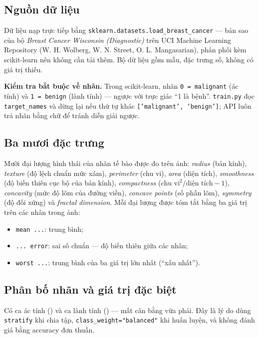 \documentclass[12pt]{article}
\newcommand{\canhbao}[1]{\par\noindent\colorbox{warnbg}{\parbox{\dimexpr\linewidth-2\fboxsep}{#1}}\par}
\begin{document}
\subsection{Nguồn dữ liệu}
Dữ liệu nạp trực tiếp bằng \texttt{sklearn.datasets.load\_breast\_cancer} --- bản sao của bộ
\emph{Breast Cancer Wisconsin (Diagnostic)} trên UCI Machine Learning Repository (W. H. Wolberg, W. N. Street,
O. L. Mangasarian), phân phối kèm scikit-learn nên không cần tải thêm. Bộ dữ liệu gồm \NSamples{} mẫu,
\NFeatures{} đặc trưng số, không có giá trị thiếu.

\canhbao{\textbf{Kiểm tra bắt buộc về nhãn.} Trong scikit-learn, nhãn \texttt{0 = malignant} (ác tính) và
\texttt{1 = benign} (lành tính) --- ngược với trực giác ``1 là bệnh''. \texttt{train.py} đọc \texttt{target\_names}
và dừng lại nếu thứ tự khác \texttt{['malignant', 'benign']}; API luôn trả nhãn bằng chữ để tránh diễn giải ngược.}

\subsection{Ba mươi đặc trưng}
Mười đại lượng hình thái của nhân tế bào được đo trên ảnh: \emph{radius} (bán kính), \emph{texture} (độ lệch chuẩn
mức xám), \emph{perimeter} (chu vi), \emph{area} (diện tích), \emph{smoothness} (độ biến thiên cục bộ của bán kính),
\emph{compactness} ($\text{chu vi}^2/\text{diện tích} - 1$), \emph{concavity} (mức độ lõm của đường viền),
\emph{concave points} (số phần lõm), \emph{symmetry} (độ đối xứng) và \emph{fractal dimension}. Mỗi đại lượng được
tóm tắt bằng ba giá trị trên các nhân trong ảnh:
\begin{itemize}
  \item \texttt{mean ...}: trung bình;
  \item \texttt{... error}: sai số chuẩn --- độ biến thiên giữa các nhân;
  \item \texttt{worst ...}: trung bình của ba giá trị lớn nhất (``xấu nhất'').
\end{itemize}

\subsection{Phân bố nhãn và giá trị đặc biệt}
Có \NMalignant{} ca ác tính (\PctMalignant) và \NBenign{} ca lành tính (\PctBenign) --- mất cân bằng vừa phải. Đây
là lý do dùng \texttt{stratify} khi chia tập, \texttt{class\_weight="balanced"} khi huấn luyện, và không đánh giá
bằng accuracy đơn thuần.
\end{document}
